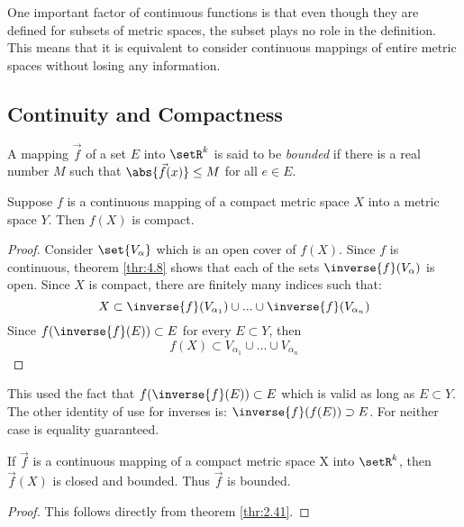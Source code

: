 \documentclass[12pt, letterpaper]{paper}
\begin{document}
One important factor of continuous functions is that even though they
are defined for subsets of metric spaces, the subset plays no role in
the definition. This means that it is equivalent to consider
continuous mappings of entire metric spaces without losing any
information.

\subsection{Continuity and Compactness}
A mapping $\vec{f}$ of a set $E$ into $\setR^k$ is said to be
\emph{bounded} if there is a real number $M$ such that
$\abs{\vec{f}(x)} \leq M$ for all $e \in E$.

\begin{theorem}
  \label{thr:4.14}
  Suppose $f$ is a continuous mapping of a compact metric space $X$
  into a metric space $Y$. Then $f(X)$ is compact.

  \begin{proof}
    Consider $\set{V_{\alpha}}$ which is an open cover of
    $f(X)$. Since $f$ is continuous, theorem \ref{thr:4.8} shows that
    each of the sets $\inverse{f}(V_{\alpha})$ is open. Since $X$ is
    compact, there are finitely many indices such that:
    \begin{equation*}
      X \subset \inverse{f}(V_{\alpha_1}) \cup ... \cup \inverse{f}(V_{\alpha_n})
    \end{equation*}
    Since $f(\inverse{f}(E)) \subset E$ for every $E \subset Y$, then
    \begin{equation*}
      f(X) \subset V_{\alpha_1} \cup ... \cup V_{\alpha_n}
    \end{equation*}
  \end{proof}
\end{theorem}

This used the fact that $f(\inverse{f}(E)) \subset E$ which is valid
as long as $E \subset Y$. The other identity of use for inverses is:
$\inverse{f}(f(E)) \supset E$. For neither case is equality
guaranteed.

\begin{theorem}
  \label{thr:4.15}
  If $\vec{f}$ is a continuous mapping of a compact metric space X
  into $\setR^k$, then $\vec{f}(X)$ is closed and bounded. Thus
  $\vec{f}$ is bounded.
  \begin{proof}
    This follows directly from theorem \ref{thr:2.41}.
  \end{proof}
\end{theorem}
\end{document}
